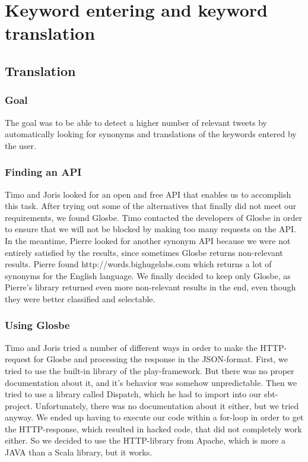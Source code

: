 \section{Keyword entering and keyword translation }
\subsection{Translation}
\label{sec:translation}
\subsubsection{Goal}
The goal was to be able to detect a higher number of relevant tweets by automatically looking for synonyms and translations of the keywords entered by the user.

\subsubsection{Finding an API}

Timo and Joris looked for an open and free API that enables us to accomplish this task. After trying out some of the alternatives that finally did not meet our requirements, we found Glosbe. Timo contacted the developers of Glosbe in order to ensure that we will not be blocked by making too many requests on the API. In the meantime, Pierre looked for another synonym API because we were not entirely satisfied by the results, since sometimes Glosbe returns non-relevant results. Pierre found http://words.bighugelabs.com which returns a lot of synonyms for the English language. We finally decided to keep only Glosbe, as Pierre's library returned even more non-relevant results in the end, even though they were better classified and selectable.

\subsubsection{Using Glosbe}

Timo and Joris tried a number of different ways in order to make the HTTP-request for Glosbe and processing the response in the JSON-format. First, we tried to use the built-in library of the play-framework. But there was no proper documentation about it, and it's behavior was somehow unpredictable. Then we tried to use a library called Dispatch, which he had to import into our sbt-project. Unfortunately, there was no documentation about it either, but we tried anyway. We ended up having to execute our code within a for-loop in order to get the HTTP-response, which resulted in hacked code, that did not completely work either. So we decided to use the HTTP-library from Apache, which is more a JAVA than a Scala library, but it works.

